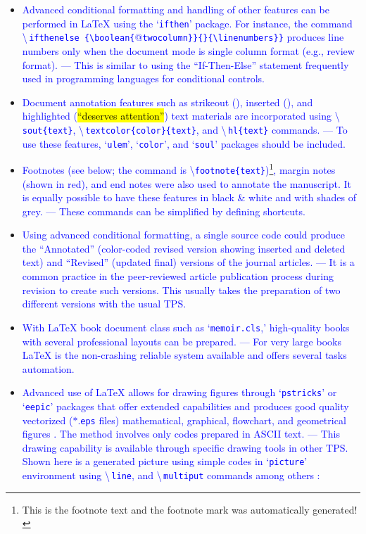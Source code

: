 \documentclass[phd]{ndsu-thesis-2022}
\newcommand\italk[1]{\textcolor{blue}{#1}}  %
\newcommand\cmd[1]{\textbackslash\texttt{#1}}  %
\newcommand\lx{\LaTeX\xspace}
\newcommand\vb[1]{\textcolor{blue}{\texttt{#1}}}%
\newcommand\vbc[1]{\textcolor{blue}{\textbackslash\,\texttt{#1}}}%
\begin{document}
\begin{itemize}[leftmargin=*, itemsep=0pt, parsep=3pt]
\item \italk{Advanced conditional formatting and handling of other features can be performed in \lx using the `\vb{ifthen}' package. For instance, the command} \vbc{ifthenelse
\{\textbackslash boolean\{$@$twocolumn\}\}\{\}\{\textbackslash linenumbers\}\}} \italk{produces line numbers only when the document mode is single column format (e.g., review format). --- This is similar to using the ``If-Then-Else'' statement frequently used in programming languages for conditional controls.}   

\item \italk{Document annotation features such as strikeout (\dt{``deleted text''}), inserted (\nt{``newly added''}), and highlighted (\hl{``deserves attention''}) text materials are incorporated using \vbc{sout\{text\}}, \vbc{textcolor\{color\}\{text\}}, and \vbc{hl\{text\}} commands. --- To use these features, `\vb{ulem}', `\vb{color}', and `\vb{soul}' packages should be included.} 

\item \italk{Footnotes (see below; the command is \cmd{footnote\{text\}})\footnote{This is the footnote text and the footnote mark was automatically generated!}, margin notes {\marginpar{\scriptsize\textcolor{red}{This is margin note shown in color.}}} (shown in red), and end notes were also used to annotate the manuscript. It is equally possible to have these features in black \& white and with shades of grey. --- These commands can be simplified by defining shortcuts.} 

\item \italk{Using advanced conditional formatting, a single source code could produce the ``Annotated'' (color-coded revised version showing inserted and deleted text) and ``Revised'' (updated final) versions of the journal articles. --- It is a common practice in the peer-reviewed article publication process during revision to create such versions. This usually takes the preparation of two different versions with the usual TPS.}  

\item \italk{With \lx book document class such as `\vb{memoir.cls},' high-quality books with several professional layouts can be prepared. --- For very large books \lx is the non-crashing reliable system available and offers several tasks automation.}   

\item \italk{Advanced use of \lx allows for drawing figures through `\vb{pstricks}' or `\vb{eepic}' packages that offer extended capabilities and produces good quality vectorized ($\ast$.\vb{eps} files) mathematical, graphical, flowchart, and geometrical figures \citep{Goossens2008g}. The method involves only codes prepared in ASCII text. --- This drawing capability is available through specific drawing tools in other TPS. Shown here is a generated picture using simple codes in `\vb{picture}' environment using \vbc{line}, and \vbc{multiput} commands among others \citep{Kern2007a, Kern2007, Mittelbach2004}:}   


\end{itemize}
\end{document}
